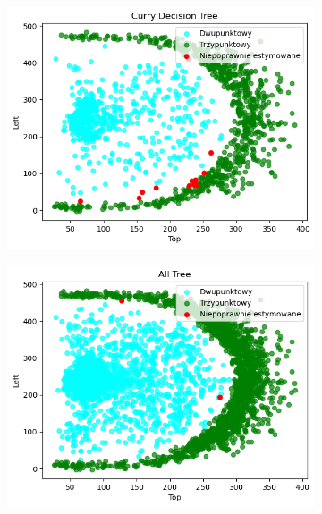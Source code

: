 \documentclass{beamer}
\begin{document}
\begin{frame}
\begin{figure}
		\begin{subfigure}[b]{0.45\textwidth}
			\includegraphics[width=\linewidth, height=0.45\textheight]{E_Tree1_scatter.png}
		\end{subfigure}
		\begin{subfigure}[b]{0.45\textwidth}
			\includegraphics[width=\linewidth, height=0.45\textheight]{E_Tree_all_scatter.png}
		\end{subfigure}
	\end{figure}
\end{frame}
\end{document}
